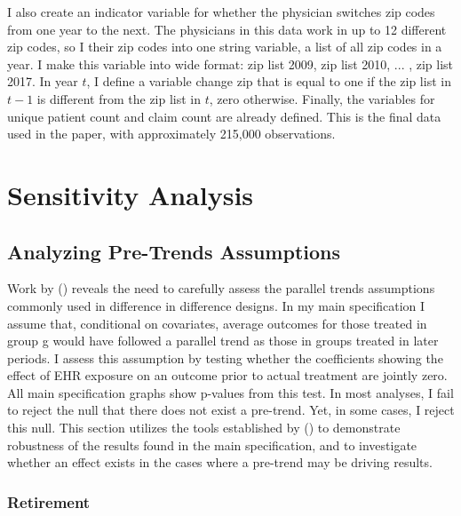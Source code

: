 \documentclass[12pt]{article}
\begin{document}
I also create an indicator variable for whether the physician switches zip codes from one year to the next. The physicians in this data work in up to 12 different zip codes, so I their zip codes into one string variable, a list of all zip codes in a year. I make this variable into wide format: zip list 2009, zip list 2010, ... , zip list 2017.  In year $t$, I define a variable change zip that is equal to one if the zip list in $t-1$ is different from the zip list in $t$, zero otherwise. Finally, the variables for unique patient count and claim count are already defined. This is the final data used in the paper, with approximately 215,000 observations. 



\section{Sensitivity Analysis}

\subsection{Analyzing Pre-Trends Assumptions}\label{sec:pretrends}

Work by \citeauthor{rambachan2019honest} (\citeyear{rambachan2019honest}) reveals the need to carefully assess the parallel trends assumptions commonly used in difference in difference designs. In my main specification I assume that, conditional on covariates, average outcomes for those treated in group g would have followed a parallel trend as those in groups treated in later periods. I assess this assumption by testing whether the coefficients showing the effect of EHR exposure on an outcome prior to actual treatment are jointly zero. All main specification graphs show p-values from this test. In most analyses, I fail to reject the null that there does not exist a pre-trend. Yet, in some cases, I reject this null. This section utilizes the tools established by \citeauthor{rambachan2019honest} (\citeyear{rambachan2019honest}) to demonstrate robustness of the results found in the main specification, and to investigate whether an effect exists in the cases where a pre-trend may be driving results. 

\subsubsection{Retirement} 
\end{document}
